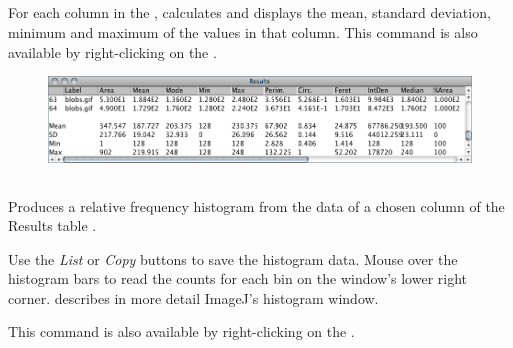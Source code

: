 

\subsection[\protect\userinterface{Summarize}]{\protect{}\label{sub:Summarize}\improvement{}}

For each column in the ,
calculates and displays the mean, standard deviation, minimum and
maximum of the values in that column. This command is also available
by right-clicking on the .
\begin{figure}[H]
\noindent \includegraphics[width=1\columnwidth]{images/Summarize}
\end{figure}





\subsection{\protect{}\label{sub:Distribution...}}

Produces a relative frequency histogram from the data of a chosen
column of the Results table \cite{C-Distribution}.

Use the \emph{List} or \emph{Copy} buttons to save the histogram data.
Mouse over the histogram bars to read the counts for each bin on the
window's lower right corner. 
describes in more detail ImageJ's histogram window. 

This command is also available by right-clicking on the .

